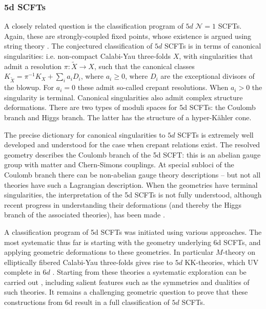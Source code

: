 \documentclass[12pt]{article}
\newcommand\CalN{\mathcal{N}}
\begin{document}
\subsubsection{5d SCFTs}
A closely related question is the classification program of $5d$ ${\CalN}=1$ SCFTs. Again, these are strongly-coupled fixed points, whose existence is argued using string theory \cite{Seiberg:1996bd, Morrison:1996xf,Intriligator:1997pq,Douglas:1996xp}. The conjectured classification of $5d$ SCFTs is in terms of canonical singularities: i.e. non-compact Calabi-Yau three-folds $X$, with singularities that admit a resolution $\pi:\widetilde{X} \rightarrow X$, such that the canonical classes  
$
K_{\tilde{X}} =\pi^{-1} K_{X} + \sum_i  a_i D_i$, where $a_i \geq 0$,
where $D_i$ are the exceptional divisors of the blowup. For $a_i=0$ these admit so-called crepant resolutions. When $a_i >0$ the singularity is terminal. 
Canonical singularities also admit complex structure deformations. 
There are two types of moduli spaces for 5d SCFTs: the Coulomb branch and Higgs branch. The latter has the structure  of  a  hyper-K{\"a}hler cone. 

The precise dictionary for canonical singularities to $5d$ SCFTs is extremely well developed and understood for the case when crepant relations exist. 
The resolved geometry describes the Coulomb branch of the 5d SCFT: this is an abelian gauge group with matter and Chern-Simons couplings. At special subloci of the Coulomb branch there can be non-abelian gauge theory descriptions -- but not all theories have such a Lagrangian description. 
When the geometries have terminal singularities, the interpretation of the 5d SCFTs is not fully understood, although recent progress in understanding their deformations (and thereby the Higgs branch of the associated theories), has been made \cite{Closset:2020scj, Closset:2020afy, Closset:2021lwy}. 


A classification program of 5d SCFTs was initiated using various approaches. The most systematic thus far is starting with the geometry underlying 6d SCFTs, and applying geometric deformations to these geometries. In particular $M$-theory on elliptically fibered Calabi-Yau three-folds gives rise to $5d$ KK-theories, which UV complete in $6d$ \cite{Jefferson:2017ahm}. Starting from these theories a systematic exploration can be carried out \cite{Bhardwaj:2018yhy,Bhardwaj:2018vuu, Apruzzi:2019enx, Apruzzi:2019opn, Apruzzi:2019vpe, Bhardwaj:2019fzv}, including salient features such as the symmetries and dualities of such theories. It remains a challenging geometric question to prove that these constructions from 6d result in a full classification of $5d$ SCFTs. 
\end{document}
